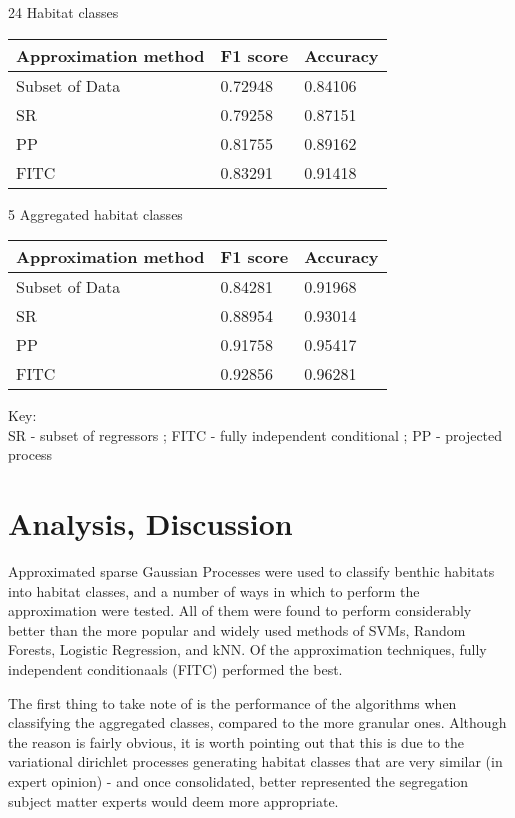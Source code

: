 \documentclass[10pt,sts]{article}
\begin{document}
\begin{multicols}{2}
24 Habitat classes 

\begin{tabular}{| l | l | l |}
    \hline
    Approximation method    & F1 score & Accuracy \\\hline
    Subset of Data          & 0.72948 & 0.84106 \\
    SR                      & 0.79258 & 0.87151 \\
    PP                      & 0.81755 & 0.89162 \\
    FITC                     & 0.83291 & 0.91418 \\
    \hline
\end{tabular}

5 Aggregated habitat classes

\begin{tabular}{|l | l | l|}
    \hline
    Approximation method    & F1 score & Accuracy \\\hline
    Subset of Data          & 0.84281 & 0.91968 \\
    SR                      & 0.88954 & 0.93014 \\
    PP                      & 0.91758 & 0.95417 \\
    FITC                     & 0.92856 & 0.96281 \\
    \hline
\end{tabular}

Key:\\
SR - subset of regressors ; FITC - fully independent conditional ; PP - projected process

\section{Analysis, Discussion}
Approximated sparse Gaussian Processes were used to classify benthic habitats into habitat classes, and a number of ways in which to perform the approximation were tested. All of them were found to perform considerably better than the more popular and widely used methods of SVMs, Random Forests, Logistic Regression, and kNN. Of the approximation techniques, fully independent conditionaals (FITC) performed the best.

The first thing to take note of is the performance of the algorithms when classifying the aggregated classes, compared to the more granular ones. Although the reason is fairly obvious, it is worth pointing out that this is due to the variational dirichlet processes generating habitat classes that are very similar (in expert opinion) - and once consolidated, better represented the segregation subject matter experts would deem more appropriate.


\end{multicols}
\end{document}
